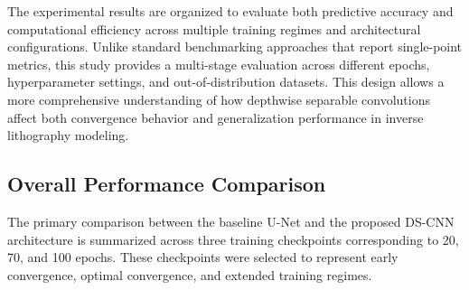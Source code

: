 \documentclass[conference]{IEEEtran}
\begin{document}
The experimental results are organized to evaluate both predictive accuracy and computational efficiency across multiple training regimes and architectural configurations. Unlike standard benchmarking approaches that report single-point metrics, this study provides a multi-stage evaluation across different epochs, hyperparameter settings, and out-of-distribution datasets. This design allows a more comprehensive understanding of how depthwise separable convolutions affect both convergence behavior and generalization performance in inverse lithography modeling.

\subsection{\textbf{Overall Performance Comparison}}

The primary comparison between the baseline U-Net and the proposed DS-CNN architecture is summarized across three training checkpoints corresponding to 20, 70, and 100 epochs. These checkpoints were selected to represent early convergence, optimal convergence, and extended training regimes.



\vspace{0.5em}
\begin{table}[h]
\centering
\caption{Overall test performance comparison between Baseline U-Net and DS-CNN U-Net across different training epochs. Lower MSE, EPE, runtime, and FLOPs indicate better performance, while higher SSIM indicates better structural fidelity. Best values are shown in bold.}
\label{tab:overall_comparison}

\end{table}
\end{document}
